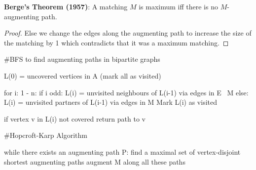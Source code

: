 \begin{theorem}
    \textbf{Berge's Theorem (1957)}: A matching $M$ is maximum iff there is no $M$-augmenting path.
\end{theorem}

\begin{proof}
    Else we change the edges along the augmenting path to increase the size of the matching by 1 which contradicts that it was a maximum matching.
\end{proof}

\begin{algorithm}
#BFS to find augmenting paths in bipartite graphs

L(0) = {uncovered vertices in A} (mark all as visited)

for i: 1 - n:
    if i odd:
        L(i) = {unvisited neighbours of L(i-1) via edges in E \ M}
    else:
        L(i) = {unvisited partners of L(i-1) via edges in M}
    Mark L(i) as visited
    
    if vertex v in L(i) not covered 
        return path to v
\end{algorithm}

\begin{algorithm}
#Hopcroft-Karp Algorithm

while there exists an augmenting path P:
    find a maximal set of vertex-disjoint shortest augmenting paths
    augment M along all these paths
\end{algorithm}

